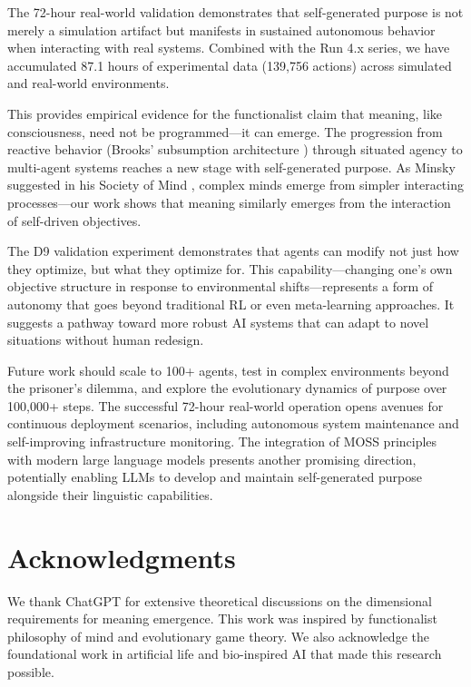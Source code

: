 \documentclass{article}
\begin{document}
The 72-hour real-world validation demonstrates that self-generated purpose is not merely a simulation artifact but manifests in sustained autonomous behavior when interacting with real systems. Combined with the Run 4.x series, we have accumulated 87.1 hours of experimental data (139,756 actions) across simulated and real-world environments.

This provides empirical evidence for the functionalist claim \citep{putnam1960minds, lewis1972psychophysical} that meaning, like consciousness, need not be programmed—it can emerge. The progression from reactive behavior (Brooks' subsumption architecture \citep{brooks1991intelligence}) through situated agency \citep{maes1990agent} to multi-agent systems \citep{wooldridge1995intelligent} reaches a new stage with self-generated purpose. As Minsky suggested in his Society of Mind \citep{minsky1986society}, complex minds emerge from simpler interacting processes—our work shows that meaning similarly emerges from the interaction of self-driven objectives.

The D9 validation experiment demonstrates that agents can modify not just how they optimize, but what they optimize for. This capability—changing one's own objective structure in response to environmental shifts—represents a form of autonomy that goes beyond traditional RL or even meta-learning approaches. It suggests a pathway toward more robust AI systems that can adapt to novel situations without human redesign.

Future work should scale to 100+ agents, test in complex environments beyond the prisoner's dilemma, and explore the evolutionary dynamics of purpose over 100,000+ steps. The successful 72-hour real-world operation opens avenues for continuous deployment scenarios, including autonomous system maintenance and self-improving infrastructure monitoring. The integration of MOSS principles with modern large language models presents another promising direction, potentially enabling LLMs to develop and maintain self-generated purpose alongside their linguistic capabilities.

\section*{Acknowledgments}

We thank ChatGPT for extensive theoretical discussions on the dimensional requirements for meaning emergence. This work was inspired by functionalist philosophy of mind and evolutionary game theory. We also acknowledge the foundational work in artificial life \citep{langton1997artificial} and bio-inspired AI \citep{floreano2008bio} that made this research possible.



\end{document}
